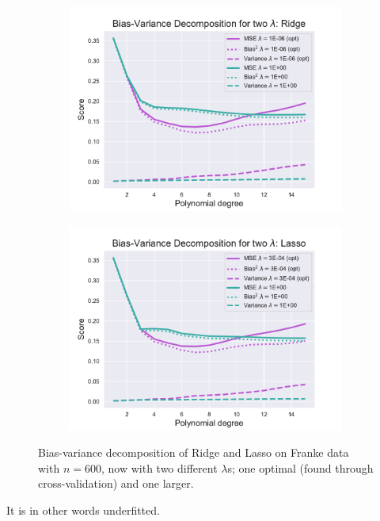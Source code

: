 \documentclass[twocolumn,english,notitlepage]{article}
\begin{document}
            \begin{figure}[ht]
                \begin{subfigure}{\linewidth}
                    \centering
                    \includegraphics[width=\linewidth]{BS_bias_var_two_lmbdas_Ridge.pdf}
                \end{subfigure}
                \begin{subfigure}{\linewidth}
                    \centering
                    \includegraphics[width=\linewidth]{BS_bias_var_two_lmbdas_Lasso.pdf}
                \end{subfigure}
                \caption{Bias-variance decomposition of Ridge and Lasso on Franke data with $n=600$, now with two different $\lambda$s; one optimal (found through cross-validation) and one larger.}
                \label{res:fig:bs_bias_var_two_lmbdas_Ridge_Lasso}
            \end{figure}
            It is in other words underfitted. 
\end{document}
